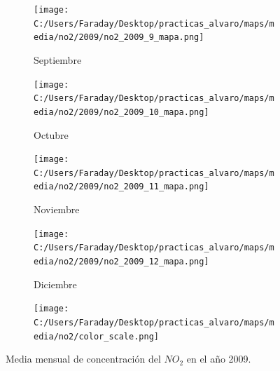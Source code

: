 \documentclass[12pt]{beamer}
\begin{document}
\begin{frame}[squeeze]
\begin{figure}[H]
\begin{subfigure}[H]{0.20\textwidth}
\texttt{[image: C:/Users/Faraday/Desktop/practicas\_alvaro/maps/media/no2/2009/no2\_2009\_9\_mapa.png]}
\captionsetup{labelformat=empty}
\caption{\scriptsize Septiembre}
\label{fig:map-no2-2009-9}
\end{subfigure}
%
\begin{subfigure}[H]{0.20\textwidth}
\texttt{[image: C:/Users/Faraday/Desktop/practicas\_alvaro/maps/media/no2/2009/no2\_2009\_10\_mapa.png]}
\captionsetup{labelformat=empty}
\caption{\scriptsize Octubre}
\label{fig:map-no2-2009-10}
\end{subfigure}
%
\begin{subfigure}[H]{0.20\textwidth}
\texttt{[image: C:/Users/Faraday/Desktop/practicas\_alvaro/maps/media/no2/2009/no2\_2009\_11\_mapa.png]}
\captionsetup{labelformat=empty}
\caption{\scriptsize Noviembre}
\label{fig:map-no2-2009-11}
\end{subfigure}
%
\begin{subfigure}[H]{0.20\textwidth}
\texttt{[image: C:/Users/Faraday/Desktop/practicas\_alvaro/maps/media/no2/2009/no2\_2009\_12\_mapa.png]}
\captionsetup{labelformat=empty}
\caption{\scriptsize Diciembre}
\label{fig:map-no2-2009-12}
\end{subfigure}

\begin{subfigure}[H]{0.45\textwidth}
\texttt{[image: C:/Users/Faraday/Desktop/practicas\_alvaro/maps/media/no2/color\_scale.png]}
\captionsetup{labelformat=empty}
\caption{}
\end{subfigure}

\vspace*{-7mm}
\caption{\scriptsize Media mensual de concentración del $NO_{2}$ en el año 2009.}
\label{fig:map-no2-2009}
\end{figure}
\end{frame}
\end{document}
